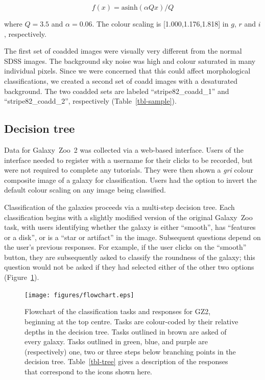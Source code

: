 \documentclass[useAMS,usenatbib]{mn2e}
\begin{document}
\begin{equation}
f(x)=\text{asinh}(\alpha Q x)/Q
\label{eqn-imagegen}
\end{equation}

\noindent where $Q=3.5$ and $\alpha=0.06$. The colour scaling is [1.000,1.176,1.818] in $g$, $r$ and $i$, respectively. 

The first set of coadded images were visually very different from the normal SDSS images. The background sky noise was high and colour saturated in many individual pixels. Since we were concerned that this could affect morphological classifications, we created a second set of coadd images with a desaturated background. The two coadded sets are labeled ``stripe82\_coadd\_1'' and ``stripe82\_coadd\_2'', respectively (Table~\ref{tbl-sample}). 

\subsection{Decision tree}\label{ssec-decision_tree}

Data for Galaxy~Zoo~2 was collected via a web-based interface. Users of the interface needed to register with a username for their clicks to be recorded, but were not required to complete any tutorials. They were then shown a {\it gri} colour composite image of a galaxy for classification. Users had the option to invert the default colour scaling on any image being classified. 

Classification of the galaxies proceeds via a multi-step decision tree. Each classification begins with a slightly modified version of the original Galaxy~Zoo task, with users identifying whether the galaxy is either ``smooth'', has ``features or a disk'', or is a ``star or artifact'' in the image. Subsequent questions depend on the user's previous responses. For example, if the user clicks on the ``smooth'' button, they are subsequently asked to classify the roundness of the galaxy; this question would not be asked if they had selected either of the other two options (Figure~\ref{fig-flowchart}). 

\begin{figure}
\texttt{[image: figures/flowchart.eps]}
\caption{Flowchart of the classification tasks and responses for GZ2, beginning at the top centre. Tasks are colour-coded by their relative depths in the decision tree. Tasks outlined in brown are asked of every galaxy. Tasks outlined in green, blue, and purple are (respectively) one, two or three steps below branching points in the decision tree. Table~\ref{tbl-tree} gives a description of the responses that correspond to the icons shown here. 
\label{fig-flowchart}}
\end{figure}
\end{document}
